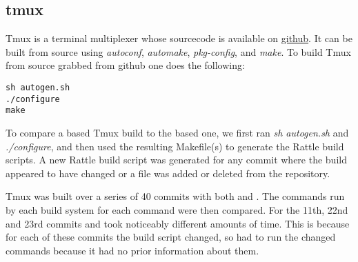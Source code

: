 \subsection{tmux}



Tmux is a terminal multiplexer whose sourcecode is available on  \href{``https://github.com/vim/vim''}{github}.  It can be built from source using \emph{autoconf}, \emph{automake}, \emph{pkg-config}, and \emph{make}.  To build Tmux from source grabbed from github one does the following:

\begin{verbatim}
sh autogen.sh
./configure
make
\end{verbatim}

To compare a \Rattle based Tmux build to the \Make based one, we first ran \emph{sh autogen.sh} and \emph{./configure}, and then used the resulting Makefile(s) to generate the Rattle build scripts.  A new Rattle build script was generated for any commit where the build appeared to have changed or a file was added or deleted from the repository.

Tmux was built over a series of 40 commits with both \Make and \Rattle.  The commands run by each build system for each command were then compared.  For the 11th, 22nd and 23rd commits \Rattle and \Make took noticeably different amounts of time.  This is because for each of these commits the build script changed, so \Rattle had to run the changed commands because it had no prior information about them.



